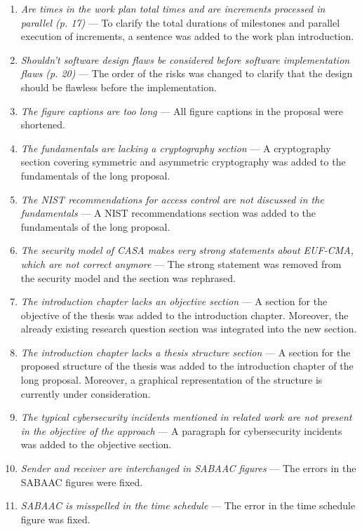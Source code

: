 \begin{enumerate}[label=Q\arabic*.]
    \item \textit{Are times in the work plan total times and are increments processed in parallel (p. 17)} --- To clarify the total durations of milestones and parallel execution of increments, a sentence was added to the work plan introduction.
    \item \textit{Shouldn't software design flaws be considered before software implementation flaws (p. 20)} --- The order of the risks was changed to clarify that the design should be flawless before the implementation.
    \item \textit{The figure captions are too long} --- All figure captions in the proposal were shortened.
    \item \textit{The fundamentals are lacking a cryptography section} --- A cryptography section covering symmetric and asymmetric cryptography was added to the fundamentals of the long proposal.
    \item \textit{The NIST recommendations for access control are not discussed in the fundamentals} --- A NIST recommendations section was added to the fundamentals of the long proposal.
    \item \textit{The security model of CASA makes very strong statements about EUF-CMA, which are not correct anymore} --- The strong statement was removed from the security model and the section was rephrased.
    \item \textit{The introduction chapter lacks an objective section} --- A section for the objective of the thesis was added to the introduction chapter. Moreover, the already existing research question section was integrated into the new section.
    \item \textit{The introduction chapter lacks a thesis structure section} --- A section for the proposed structure of the thesis was added to the introduction chapter of the long proposal. Moreover, a graphical representation of the structure is currently under consideration.
    \item \textit{The typical cybersecurity incidents mentioned in related work are not present in the objective of the approach} --- A paragraph for cybersecurity incidents was added to the objective section.
    \item \textit{Sender and receiver are interchanged in SABAAC figures} --- The errors in the SABAAC figures were fixed.
    \item \textit{SABAAC is misspelled in the time schedule} --- The error in the time schedule figure was fixed.

\end{enumerate}
